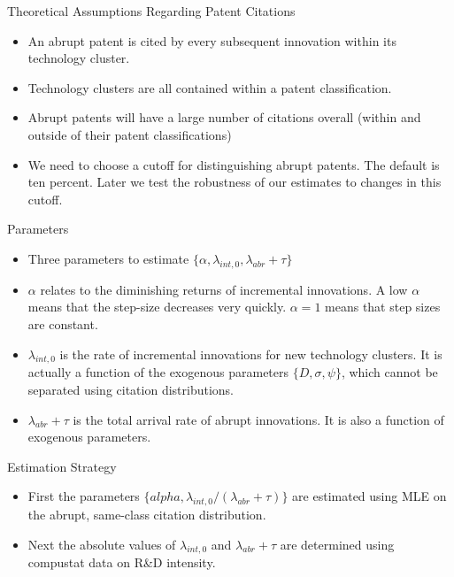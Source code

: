 \documentclass[11pt]{beamer}
\begin{document}
\begin{frame}{Theoretical Assumptions Regarding Patent Citations}
	\begin{itemize}\itemsep12pt	
		\item An abrupt patent is cited by every subsequent innovation within its technology cluster.
		\item Technology clusters are all contained within a patent classification.
		\item Abrupt patents will have a large number of citations overall (within and outside of their patent classifications)
		\item We need to choose a cutoff for distinguishing abrupt patents. The default is ten percent. Later we test the robustness of our estimates to changes in this cutoff.
	\end{itemize}
\end{frame}

\begin{frame} {Parameters}
	\begin{itemize}\itemsep 12pt
		\item Three parameters to estimate $\{\alpha , \lambda_{int, 0}, \lambda_{abr} + \tau \}$
		\item $\alpha$ relates to the diminishing returns of incremental innovations. A low $\alpha$ means that the step-size decreases very quickly. $\alpha = 1$ means that step sizes are constant.
		\item $\lambda_{int, 0}$ is the rate of incremental innovations for new technology clusters. It is actually a function of the exogenous parameters $\{D, \sigma, \psi\}$, which cannot be separated using citation distributions.
		\item $\lambda_{abr} + \tau$ is the total arrival rate of abrupt innovations. It is also a function of exogenous parameters.
	\end{itemize}
\end{frame}

\begin{frame} {Estimation Strategy}
	\begin{itemize}\itemsep 12pt
		\item First the parameters $\{alpha,\lambda_{int, 0}/ (\lambda_{abr} + \tau) \}$ are estimated using MLE on the abrupt, same-class citation distribution.
		\item Next the absolute values of $\lambda_{int, 0}$ and $\lambda_{abr} + \tau$ are determined using compustat data on R\&D intensity.
	\end{itemize}
\end{frame}
\end{document}
